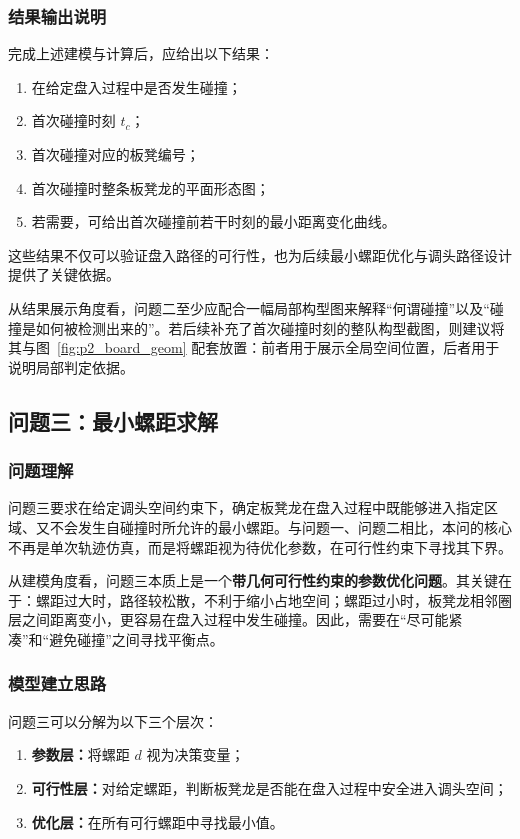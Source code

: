 \documentclass[12pt,a4paper]{ctexart}
\begin{document}
\subsubsection{结果输出说明}
完成上述建模与计算后，应给出以下结果：
\begin{enumerate}
    \item 在给定盘入过程中是否发生碰撞；
    \item 首次碰撞时刻 $t_c$；
    \item 首次碰撞对应的板凳编号；
    \item 首次碰撞时整条板凳龙的平面形态图；
    \item 若需要，可给出首次碰撞前若干时刻的最小距离变化曲线。
\end{enumerate}

\noindent 这些结果不仅可以验证盘入路径的可行性，也为后续最小螺距优化与调头路径设计提供了关键依据。


从结果展示角度看，问题二至少应配合一幅局部构型图来解释“何谓碰撞”以及“碰撞是如何被检测出来的”。若后续补充了首次碰撞时刻的整队构型截图，则建议将其与图~\ref{fig:p2_board_geom} 配套放置：前者用于展示全局空间位置，后者用于说明局部判定依据。
\subsection{问题三：最小螺距求解}

\subsubsection{问题理解}
问题三要求在给定调头空间约束下，确定板凳龙在盘入过程中既能够进入指定区域、又不会发生自碰撞时所允许的最小螺距。与问题一、问题二相比，本问的核心不再是单次轨迹仿真，而是将螺距视为待优化参数，在可行性约束下寻找其下界。

从建模角度看，问题三本质上是一个\textbf{带几何可行性约束的参数优化问题}。其关键在于：螺距过大时，路径较松散，不利于缩小占地空间；螺距过小时，板凳龙相邻圈层之间距离变小，更容易在盘入过程中发生碰撞。因此，需要在“尽可能紧凑”和“避免碰撞”之间寻找平衡点。

\subsubsection{模型建立思路}
问题三可以分解为以下三个层次：

\begin{enumerate}
    \item \textbf{参数层：}将螺距 $d$ 视为决策变量；
    \item \textbf{可行性层：}对给定螺距，判断板凳龙是否能在盘入过程中安全进入调头空间；
    \item \textbf{优化层：}在所有可行螺距中寻找最小值。
\end{enumerate}
\end{document}

